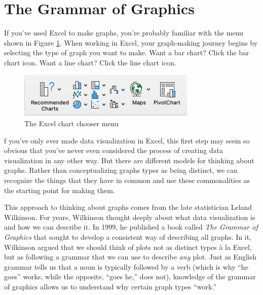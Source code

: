 \documentclass[
]{book}
\begin{document}
\hypertarget{the-grammar-of-graphics}{%
\section*{The Grammar of Graphics}\label{the-grammar-of-graphics}}

If you've used Excel to make graphs, you're probably familiar with the menu shown in Figure \ref{fig:excel-chart-chooser}. When working in Excel, your graph-making journey begins by selecting the type of graph you want to make. Want a bar chart? Click the bar chart icon. Want a line chart? Click the line chart icon.

\begin{figure}
\includegraphics[width=1\linewidth]{assets/excel-chart-chooser} \caption{The Excel chart chooser menu}\label{fig:excel-chart-chooser}
\end{figure}

f you've only ever made data visualization in Excel, this first step may seem so obvious that you've never even considered the process of creating data visualization in any other way. But there are different models for thinking about graphs. Rather than conceptualizing graphs types as being distinct, we can recognize the things that they have in common and use these commonalities as the starting point for making them.

This approach to thinking about graphs comes from the late statistician Leland Wilkinson. For years, Wilkinson thought deeply about what data visualization is and how we can describe it. In 1999, he published a book called \emph{The Grammar of Graphics} that sought to develop a consistent way of describing all graphs. In it, Wilkinson argued that we should think of plots not as distinct types à la Excel, but as following a grammar that we can use to describe \emph{any} plot. Just as English grammar tells us that a noun is typically followed by a verb (which is why ``he goes'' works, while the opposite, ``goes he,'' does not), knowledge of the grammar of graphics allows us to understand why certain graph types ``work.''
\end{document}
